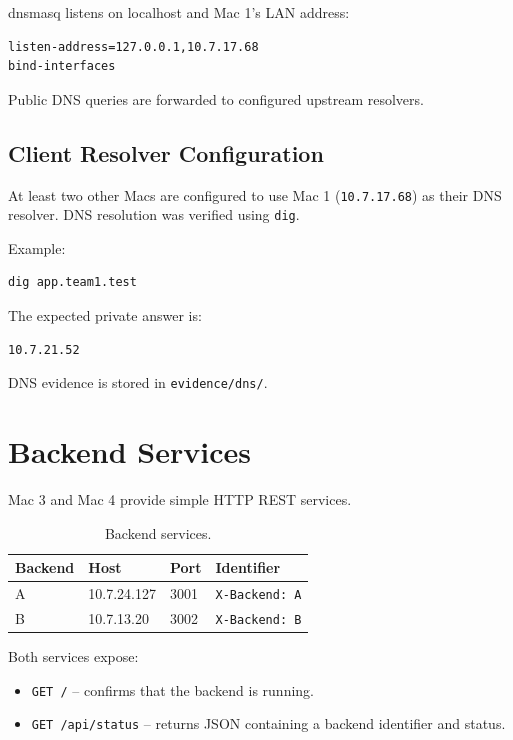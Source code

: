\documentclass[11pt,a4paper]{article}
\begin{document}
dnsmasq listens on localhost and Mac 1's LAN address:

\begin{lstlisting}
listen-address=127.0.0.1,10.7.17.68
bind-interfaces
\end{lstlisting}

Public DNS queries are forwarded to configured upstream resolvers.

\subsection{Client Resolver Configuration}

At least two other Macs are configured to use Mac 1
(\texttt{10.7.17.68}) as their DNS resolver. DNS resolution was verified
using \texttt{dig}.

Example:

\begin{lstlisting}
dig app.team1.test
\end{lstlisting}

The expected private answer is:

\begin{lstlisting}
10.7.21.52
\end{lstlisting}

DNS evidence is stored in \texttt{evidence/dns/}.

\section{Backend Services}

Mac 3 and Mac 4 provide simple HTTP REST services.

\begin{table}[H]
\centering
\begin{tabular}{llll}
\toprule
\textbf{Backend} & \textbf{Host} & \textbf{Port} & \textbf{Identifier} \\
\midrule
A & 10.7.24.127 & 3001 & \texttt{X-Backend: A} \\
B & 10.7.13.20 & 3002 & \texttt{X-Backend: B} \\
\bottomrule
\end{tabular}
\caption{Backend services.}
\end{table}

Both services expose:

\begin{itemize}
    \item \texttt{GET /} -- confirms that the backend is running.
    \item \texttt{GET /api/status} -- returns JSON containing a backend identifier and status.
\end{itemize}
\end{document}
